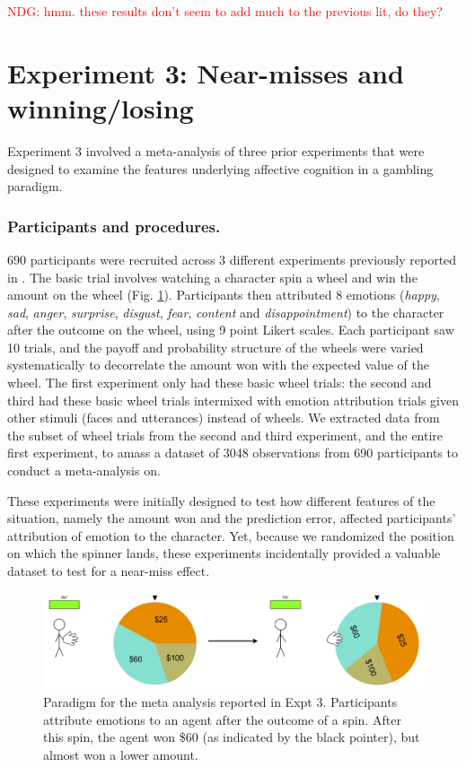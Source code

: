 \documentclass[10pt,letterpaper]{article}
\newcommand{\red}[1]{\textcolor{Red}{#1}}
\begin{document}
\red{NDG: hmm. these results don't seem to add much to the previous lit, do they?}

\section{Experiment 3: Near-misses and winning/losing}
	Experiment 3 involved a meta-analysis of three prior experiments that were designed to examine the features underlying affective cognition in a gambling paradigm. 
	
\subsubsection{Participants and procedures.}
	690 participants were recruited across 3 different experiments previously reported in . The basic trial involves watching a character spin a wheel and win the amount on the wheel (Fig. \ref{Expt3ParadigmFig}). Participants then attributed 8 emotions (\textit{happy}, \textit{sad}, \textit{anger}, \textit{surprise}, \textit{disgust}, \textit{fear}, \textit{content} and \textit{disappointment}) to the character after the outcome on the wheel, using 9 point Likert scales. Each participant saw 10 trials, and the payoff and probability structure of the wheels were varied systematically to decorrelate the amount won with the expected value of the wheel. The first experiment only had these basic wheel trials: the second and third had these basic wheel trials intermixed with emotion attribution trials given other stimuli (faces and utterances) instead of wheels. We extracted data from the subset of wheel trials from the second and third experiment, and the entire first experiment, to amass a dataset of 3048 observations from 690 participants to conduct a meta-analysis on.
	
	These experiments were initially designed to test how different features of the situation, namely the amount won and the prediction error, affected participants' attribution of emotion to the character. Yet, because we randomized the position on which the spinner lands, these experiments incidentally provided a valuable dataset to test for a near-miss effect.

\begin{figure}[htb!]
\includegraphics[width=\columnwidth]{images/expt3Paradigm.png}
\caption{ Paradigm for the meta analysis reported in Expt 3. Participants attribute emotions to an agent after the outcome of a spin. After this spin, the agent won \$60 (as indicated by the black pointer), but almost won a lower amount. }
\label{Expt3ParadigmFig}
\end{figure}
\end{document}
